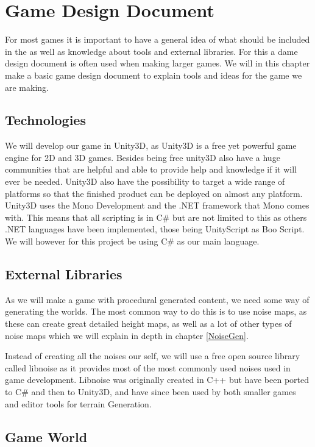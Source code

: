 \chapter{Game Design Document}

For most games it is important to have a general idea of what should be included in the as well as knowledge about tools and external libraries. For this a dame design document is often used when making larger games. We will in this chapter make a basic game design document to explain tools and ideas for the game we are making.


\section{Technologies}

We will develop our game in Unity3D\cite{Unity3D}, as Unity3D is a free yet powerful game engine for 2D and 3D games. Besides being free unity3D also have a huge communities that are helpful and able to provide help and knowledge if it will ever be needed. Unity3D also have the possibility to target a wide range of platforms so that the finished product can be deployed on almost any platform. Unity3D uses the Mono Development and the .NET framework that Mono comes with. This means that all scripting is in C\# but are not limited to this as others .NET languages have been implemented, those being UnityScript as Boo Script. We will however for this project be using C\# as our main language.


\section{External Libraries}

As we will make a game with procedural generated content, we need some way of generating the worlds. The most common way to do this is to use noise maps, as these can create great detailed height maps, as well as a lot of other types of noise maps which we will explain in depth in chapter \ref{NoiseGen}.

Instead of creating all the noises our self, we will use a free open source library called libnoise as it provides most of the most commonly used noises used in game development. Libnoise was originally created in C++ but have been ported to C\# and then to Unity3D, and have since been used by both smaller games and editor tools for terrain Generation.


\section{Game World}

